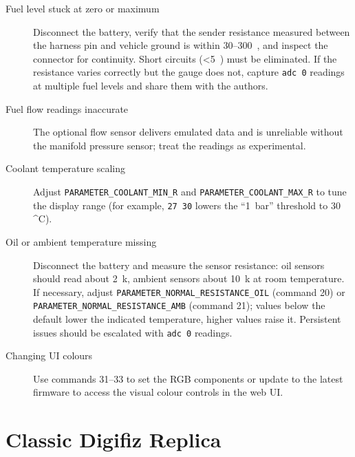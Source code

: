 \begin{description}
    \item[Fuel level stuck at zero or maximum] Disconnect the battery, verify that the sender resistance measured between the harness pin and vehicle ground is within 30--300~\ohm{}, and inspect the connector for continuity. Short circuits (<5~\ohm{}) must be eliminated. If the resistance varies correctly but the gauge does not, capture \verb|adc 0| readings at multiple fuel levels and share them with the authors.
    \item[Fuel flow readings inaccurate] The optional flow sensor delivers emulated data and is unreliable without the manifold pressure sensor; treat the readings as experimental.
    \item[Coolant temperature scaling] Adjust \texttt{PARAMETER\_COOLANT\_MIN\_R} and \texttt{PARAMETER\_COOLANT\_MAX\_R} to tune the display range (for example, \verb|27 30| lowers the ``1~bar'' threshold to 30~\,^{\circ}C).
    \item[Oil or ambient temperature missing] Disconnect the battery and measure the sensor resistance: oil sensors should read about 2~k\ohm{}, ambient sensors about 10~k\ohm{} at room temperature. If necessary, adjust \texttt{PARAMETER\_NORMAL\_RESISTANCE\_OIL} (command 20) or \texttt{PARAMETER\_NORMAL\_RESISTANCE\_AMB} (command 21); values below the default lower the indicated temperature, higher values raise it. Persistent issues should be escalated with \verb|adc 0| readings.
    \item[Changing UI colours] Use commands 31--33 to set the RGB components or update to the latest firmware to access the visual colour controls in the web UI.
\end{description}

\section{Classic Digifiz Replica}


